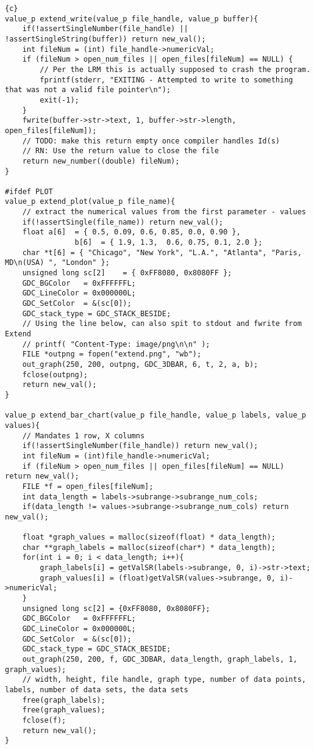 \begin{lstlisting}{c}
value_p extend_write(value_p file_handle, value_p buffer){
	if(!assertSingleNumber(file_handle) || !assertSingleString(buffer)) return new_val();
	int fileNum = (int) file_handle->numericVal;
	if (fileNum > open_num_files || open_files[fileNum] == NULL) {
		// Per the LRM this is actually supposed to crash the program.
		fprintf(stderr, "EXITING - Attempted to write to something that was not a valid file pointer\n");
		exit(-1);
	}
	fwrite(buffer->str->text, 1, buffer->str->length, open_files[fileNum]);
	// TODO: make this return empty once compiler handles Id(s)
	// RN: Use the return value to close the file
	return new_number((double) fileNum);
}

#ifdef PLOT
value_p extend_plot(value_p file_name){
	// extract the numerical values from the first parameter - values
	if(!assertSingle(file_name)) return new_val();
	float a[6]  = { 0.5, 0.09, 0.6, 0.85, 0.0, 0.90 },
				b[6]  = { 1.9, 1.3,  0.6, 0.75, 0.1, 2.0 };
	char *t[6] = { "Chicago", "New York", "L.A.", "Atlanta", "Paris, MD\n(USA) ", "London" };
	unsigned long sc[2]    = { 0xFF8080, 0x8080FF };
	GDC_BGColor   = 0xFFFFFFL;
	GDC_LineColor = 0x000000L;
	GDC_SetColor  = &(sc[0]);
	GDC_stack_type = GDC_STACK_BESIDE;
	// Using the line below, can also spit to stdout and fwrite from Extend
	// printf( "Content-Type: image/png\n\n" );
	FILE *outpng = fopen("extend.png", "wb");
	out_graph(250, 200, outpng, GDC_3DBAR, 6, t, 2, a, b);
	fclose(outpng);
	return new_val();
}

value_p extend_bar_chart(value_p file_handle, value_p labels, value_p values){
	// Mandates 1 row, X columns
	if(!assertSingleNumber(file_handle)) return new_val();
	int fileNum = (int)file_handle->numericVal;
	if (fileNum > open_num_files || open_files[fileNum] == NULL)  return new_val();
	FILE *f = open_files[fileNum];
	int data_length = labels->subrange->subrange_num_cols;
	if(data_length != values->subrange->subrange_num_cols) return new_val();

	float *graph_values = malloc(sizeof(float) * data_length);
	char **graph_labels = malloc(sizeof(char*) * data_length);
	for(int i = 0; i < data_length; i++){
		graph_labels[i] = getValSR(labels->subrange, 0, i)->str->text;
		graph_values[i] = (float)getValSR(values->subrange, 0, i)->numericVal;
	}
	unsigned long sc[2] = {0xFF8080, 0x8080FF};
	GDC_BGColor   = 0xFFFFFFL;
	GDC_LineColor = 0x000000L;
	GDC_SetColor  = &(sc[0]);
	GDC_stack_type = GDC_STACK_BESIDE;
	out_graph(250, 200, f, GDC_3DBAR, data_length, graph_labels, 1, graph_values);
	// width, height, file handle, graph type, number of data points, labels, number of data sets, the data sets
	free(graph_labels);
	free(graph_values);
	fclose(f);
	return new_val();
}


\end{lstlisting}
